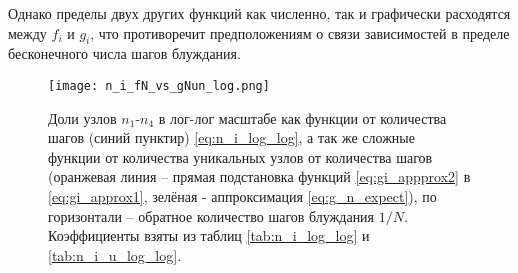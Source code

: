 Однако пределы двух других функций как численно, так и графически расходятся между $f_i$ и $g_i$, что противоречит предположениям о связи зависимостей в пределе бесконечного числа шагов блуждания.


\begin{figure}
\centering
\texttt{[image: n\_i\_fN\_vs\_gNun\_log.png]}
\caption{Доли узлов $n_1$-$n_4$ в лог-лог масштабе как функции от количества шагов (синий пунктир) \eqref{eq:n_i_log_log}, а так же сложные функции от количества уникальных узлов от количества шагов (оранжевая линия -- прямая подстановка функций  \eqref{eq:gi_appprox2} в \eqref{eq:gi_approx1}, зелёная - аппроксимация \eqref{eq:g_n_expect}), по горизонтали -- обратное количество шагов блуждания $1/N$. Коэффициенты взяты из таблиц \ref{tab:n_i_log_log} и \ref{tab:n_i_u_log_log}.}
\label{fig:ni_fn_vs_gNun_log}
\end{figure}